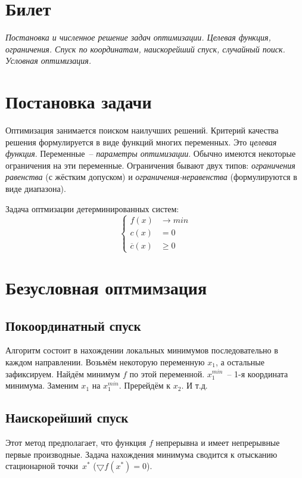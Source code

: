 \documentclass[10pt]{article}
\newcommand{\mys}{\textit}
\begin{document}
\section*{Билет }
{\em Постановка и численное решение задач оптимизации. Целевая функция, ограничения. 
Спуск по координатам, наискорейший спуск, случайный поиск. Условная оптимизация.}

\section{Постановка задачи}
	Оптимизация занимается поиском наилучших решений. Критерий качества решения формулируется в виде функций многих переменных.
	Это \mys{целевая функция}. Переменные~-- \mys{параметры оптимизации}. Обычно имеются некоторые ограничения на эти переменные.
	Ограничения бывают двух типов: \mys{ограничения равенства} (с жёстким допуском) и \mys{ограничения-неравенства} (формулируются в виде диапазона).

	Задача оптмизации детерминированных систем:
	\begin{equation}
		\left\{
			\begin{aligned}
				f(x) &\rightarrow min \\
				c(x) &= 0 \\
				\overline{c}(x) &\ge 0
			\end{aligned}
		\right.
	\end{equation}

\section{Безусловная оптмимзация}
	\subsection{Покоординатный спуск}
		Алгоритм состоит в нахождении локальных минимумов последовательно в каждом направлении.
		Возьмём некоторую переменную $x_1$, а остальные зафиксируем. Найдём минимум $f$ по этой переменной. $x_1^{min}$~-- 1-я координата минимума.
		Заменим $x_1$ на $x_1^{min}$. Пререйдём к $x_2$. И т.д.

	\subsection{Наискорейший спуск}
		Этот метод предполагает, что функция $f$ непрерывна и имеет непрерывные первые производные.
		Задача нахождения минимума сводится к отысканию стационарной точки~$x^*$ ($\bigtriangledown f(x^*) = 0$).
	
\end{document}
